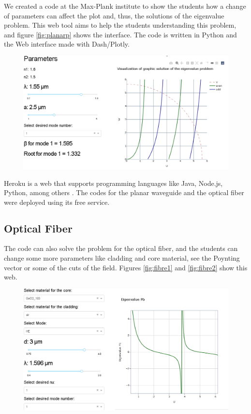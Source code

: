 We created a code at the Max-Plank institute \cite{gitmax} to show the students how a change of parameters can affect the plot and, thus, the solutions of the eigenvalue problem. This web tool aims to help the students understanding this problem, and figure \ref{fig:planarp}  shows the interface. The code is written in Python and the Web interface made with Dash/Plotly.  

\begin{figure}[label={fig:planarp}, caption={\href{https://fiber-mode-app.herokuapp.com/apps/dash_plot}{Heroku app} for the planar waveguide.}]
	\includegraphics[width=.8\textwidth]{figures/chap2/planarpage.png} 
\end{figure}


Heroku is a web that supports programming languages like Java, Node.js, Python, among others \cite{heorku}. The codes for the planar waveguide and the optical fiber were deployed using its free service.

\subsection{Optical Fiber}

The code can also solve the problem for the optical fiber, and the students can change some more parameters like cladding and core material, see the Poynting vector or some of the cuts of the field. Figures \ref{fig:fibre1} and \ref{fig:fibre2} show this web. 

\begin{figure}[label={fig:fibre1}, caption={\href{https://fiber-mode-app.herokuapp.com/apps/results}{Heroku app} for the optical fiber (1).}]
	\includegraphics[width=.8\textwidth]{figures/chap2/fibre1.PNG} 
\end{figure}

